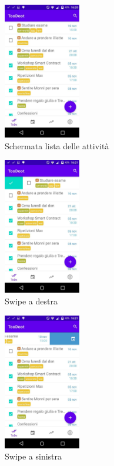 \documentclass[]{article}
\begin{document}
\begin{figure}
\centering
\includegraphics[width=0.3\textwidth,height=0.1\textheight]{./img/schermata_todo.jpg}
\caption{Schermata lista delle attività}
\end{figure}

\begin{figure}
\centering
\includegraphics[width=0.3\textwidth,height=0.1\textheight]{./img/swipe_dx.jpg}
\caption{Swipe a destra}
\end{figure}

\begin{figure}
\centering
\includegraphics[width=0.3\textwidth,height=0.1\textheight]{./img/swipe_sx.jpg}
\caption{Swipe a sinistra}
\end{figure}
\end{document}
